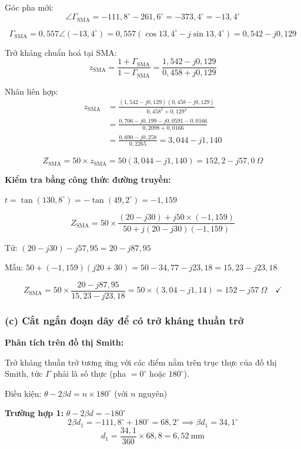 \documentclass[12pt,a4paper]{article}
\begin{document}
Góc pha mới:
\[
\angle\Gamma_{\text{SMA}} = -111{,}8^\circ - 261{,}6^\circ = -373{,}4^\circ = -13{,}4^\circ
\]

\[
\Gamma_{\text{SMA}} = 0{,}557\angle(-13{,}4^\circ) = 0{,}557(\cos 13{,}4^\circ - j\sin 13{,}4^\circ) = 0{,}542 - j0{,}129
\]

Trở kháng chuẩn hoá tại SMA:
\[
z_{\text{SMA}} = \frac{1 + \Gamma_{\text{SMA}}}{1 - \Gamma_{\text{SMA}}} = \frac{1{,}542 - j0{,}129}{0{,}458 + j0{,}129}
\]

Nhân liên hợp:
\begin{align*}
z_{\text{SMA}} &= \frac{(1{,}542 - j0{,}129)(0{,}458 - j0{,}129)}{0{,}458^2 + 0{,}129^2} \\
&= \frac{0{,}706 - j0{,}199 - j0{,}0591 - 0{,}0166}{0{,}2098 + 0{,}0166} \\
&= \frac{0{,}690 - j0{,}258}{0{,}2265} = 3{,}044 - j1{,}140
\end{align*}

\[
\boxed{Z_{\text{SMA}} = 50 \times z_{\text{SMA}} = 50(3{,}044 - j1{,}140) = 152{,}2 - j57{,}0~\Omega}
\]

\textbf{Kiểm tra bằng công thức đường truyền:}

$t = \tan(130{,}8^\circ) = -\tan(49{,}2^\circ) = -1{,}159$

\[
Z_{\text{SMA}} = 50 \times \frac{(20 - j30) + j50 \times (-1{,}159)}{50 + j(20 - j30)(-1{,}159)}
\]

Tử: $(20 - j30) - j57{,}95 = 20 - j87{,}95$

Mẫu: $50 + (-1{,}159)(j20 + 30) = 50 - 34{,}77 - j23{,}18 = 15{,}23 - j23{,}18$

\[
Z_{\text{SMA}} = 50 \times \frac{20 - j87{,}95}{15{,}23 - j23{,}18} = 50 \times (3{,}04 - j1{,}14) = 152 - j57~\Omega \quad \checkmark
\]

\subsubsection{(c) Cắt ngắn đoạn dây để có trở kháng thuần trở}

\textbf{Phân tích trên đồ thị Smith:}

Trở kháng thuần trở tương ứng với các điểm nằm trên trục thực của đồ thị Smith, tức $\Gamma$ phải là số thực (pha $= 0^\circ$ hoặc $180^\circ$).

Điều kiện: $\theta - 2\beta d = n \times 180^\circ$ (với $n$ nguyên)

\textbf{Trường hợp 1:} $\theta - 2\beta d = -180^\circ$
\[
2\beta d_1 = -111{,}8^\circ + 180^\circ = 68{,}2^\circ \implies \beta d_1 = 34{,}1^\circ
\]
\[
d_1 = \frac{34{,}1}{360} \times 68{,}8 = 6{,}52~\text{mm}
\]
\end{document}
